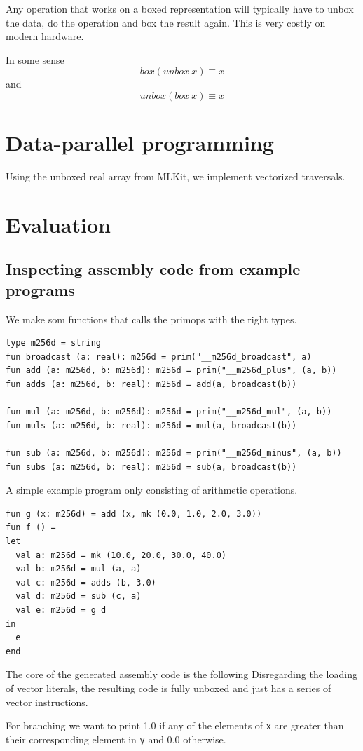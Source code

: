 \documentclass{article}
\begin{document}
Any operation that works on a boxed representation will typically have to unbox the data, do the operation and box the result again. This is very costly on modern hardware.

In some sense
\[
    box (unbox\ x) \equiv x
\]
and
\[
    unbox (box\ x) \equiv x
\]

\section{Data-parallel programming}

Using the unboxed real array from MLKit, we implement vectorized traversals.

\section{Evaluation}

\subsection{Inspecting assembly code from example programs}

We make som functions that calls the primops with the right types.
\begin{lstlisting}
type m256d = string
fun broadcast (a: real): m256d = prim("__m256d_broadcast", a)
fun add (a: m256d, b: m256d): m256d = prim("__m256d_plus", (a, b))
fun adds (a: m256d, b: real): m256d = add(a, broadcast(b))

fun mul (a: m256d, b: m256d): m256d = prim("__m256d_mul", (a, b))
fun muls (a: m256d, b: real): m256d = mul(a, broadcast(b))

fun sub (a: m256d, b: m256d): m256d = prim("__m256d_minus", (a, b))
fun subs (a: m256d, b: real): m256d = sub(a, broadcast(b))
\end{lstlisting}
A simple example program only consisting of arithmetic operations.
\begin{lstlisting}
fun g (x: m256d) = add (x, mk (0.0, 1.0, 2.0, 3.0))
fun f () =
let
  val a: m256d = mk (10.0, 20.0, 30.0, 40.0)
  val b: m256d = mul (a, a)
  val c: m256d = adds (b, 3.0)
  val d: m256d = sub (c, a)
  val e: m256d = g d
in 
  e
end
\end{lstlisting}
The core of the generated assembly code is the following
Disregarding the loading of vector literals, the resulting code is fully unboxed and just has a series of vector instructions.

For branching we want to print 1.0 if any of the elements of \verb!x! are greater than their corresponding element in \verb!y! and 0.0 otherwise.
\end{document}
